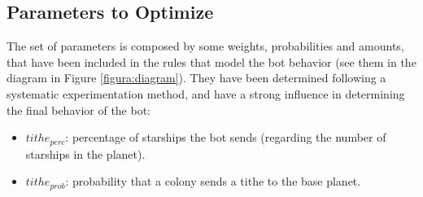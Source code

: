 \documentclass{llncs}
\begin{document}

\subsection{Parameters to Optimize}
\label{subsec:parameters}

The set of parameters is composed by some weights, probabilities and amounts, that have been included in the rules that model the bot behavior (see them in the diagram in Figure \ref{figura:diagram}). They have been determined following a systematic experimentation method, and have a strong influence in determining the final behavior of the bot:

\begin{itemize}

	\item $tithe_{perc}$:  percentage of starships the bot sends (regarding the number of starships in the planet).

	\item $tithe_{prob}$: probability that a colony sends a tithe to the base planet.


\end{itemize}
\end{document}
